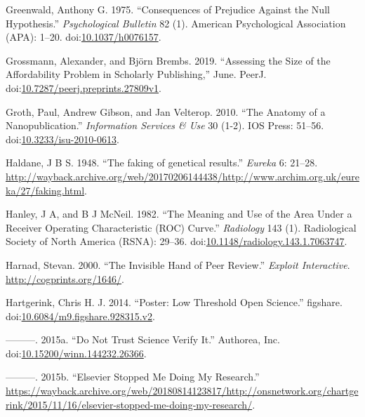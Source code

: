 \documentclass[a5paper]{book}
\begin{document}
\hypertarget{ref-doi:10.1037ux2fh0076157}{}
Greenwald, Anthony G. 1975. ``Consequences of Prejudice Against the Null
Hypothesis.'' \emph{Psychological Bulletin} 82 (1). American
Psychological Association (APA): 1--20.
doi:\href{https://doi.org/10.1037/h0076157}{10.1037/h0076157}.

\hypertarget{ref-doi:10.7287ux2fpeerj.preprints.27809v1}{}
Grossmann, Alexander, and Björn Brembs. 2019. ``Assessing the Size of
the Affordability Problem in Scholarly Publishing,'' June. PeerJ.
doi:\href{https://doi.org/10.7287/peerj.preprints.27809v1}{10.7287/peerj.preprints.27809v1}.

\hypertarget{ref-doi:10.3233ux2fisu-2010-0613}{}
Groth, Paul, Andrew Gibson, and Jan Velterop. 2010. ``The Anatomy of a
Nanopublication.'' \emph{Information Services \& Use} 30 (1-2). IOS
Press: 51--56.
doi:\href{https://doi.org/10.3233/isu-2010-0613}{10.3233/isu-2010-0613}.

\hypertarget{ref-Haldane1948-nm}{}
Haldane, J B S. 1948. ``The faking of genetical results.'' \emph{Eureka}
6: 21--28.
\url{http://wayback.archive.org/web/20170206144438/http://www.archim.org.uk/eureka/27/faking.html}.

\hypertarget{ref-doi:10.1148ux2fradiology.143.1.7063747}{}
Hanley, J A, and B J McNeil. 1982. ``The Meaning and Use of the Area
Under a Receiver Operating Characteristic (ROC) Curve.''
\emph{Radiology} 143 (1). Radiological Society of North America (RSNA):
29--36.
doi:\href{https://doi.org/10.1148/radiology.143.1.7063747}{10.1148/radiology.143.1.7063747}.

\hypertarget{ref-cogprints1646}{}
Harnad, Stevan. 2000. ``The Invisible Hand of Peer Review.''
\emph{Exploit Interactive}. \url{http://cogprints.org/1646/}.

\hypertarget{ref-doi:10.6084ux2fm9.figshare.928315.v2}{}
Hartgerink, Chris H. J. 2014. ``Poster: Low Threshold Open Science.''
figshare.
doi:\href{https://doi.org/10.6084/m9.figshare.928315.v2}{10.6084/m9.figshare.928315.v2}.

\hypertarget{ref-doi:10.15200ux2fwinn.144232.26366}{}
---------. 2015a. ``Do Not Trust Science Verify It.'' Authorea, Inc.
doi:\href{https://doi.org/10.15200/winn.144232.26366}{10.15200/winn.144232.26366}.

\hypertarget{ref-ons-elsevier}{}
---------. 2015b. ``Elsevier Stopped Me Doing My Research.''
\url{https://wayback.archive.org/web/20180814123817/http://onsnetwork.org/chartgerink/2015/11/16/elsevier-stopped-me-doing-my-research/}.
\end{document}
